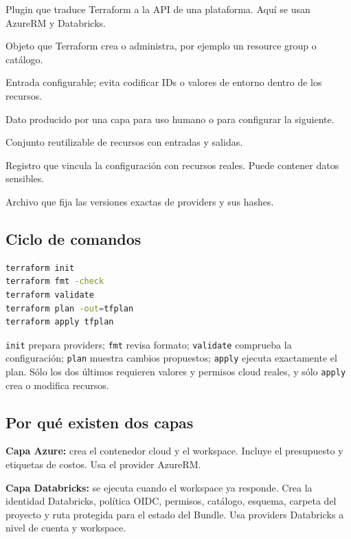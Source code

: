 \documentclass[11pt,a4paper]{article}
\begin{document}
\begin{description}[style=nextline,leftmargin=2em]
  \item[Provider] Plugin que traduce Terraform a la API de una plataforma. Aquí se usan AzureRM y Databricks.
  \item[Resource] Objeto que Terraform crea o administra, por ejemplo un resource group o catálogo.
  \item[Variable] Entrada configurable; evita codificar IDs o valores de entorno dentro de los recursos.
  \item[Output] Dato producido por una capa para uso humano o para configurar la siguiente.
  \item[Module] Conjunto reutilizable de recursos con entradas y salidas.
  \item[State] Registro que vincula la configuración con recursos reales. Puede contener datos sensibles.
  \item[Lockfile] Archivo que fija las versiones exactas de providers y sus hashes.
\end{description}

\subsection{Ciclo de comandos}

\begin{lstlisting}[language=bash]
terraform init
terraform fmt -check
terraform validate
terraform plan -out=tfplan
terraform apply tfplan
\end{lstlisting}

\texttt{init} prepara providers; \texttt{fmt} revisa formato; \texttt{validate} comprueba la
configuración; \texttt{plan} muestra cambios propuestos; \texttt{apply} ejecuta exactamente el plan.
Sólo los dos últimos requieren valores y permisos cloud reales, y sólo \texttt{apply} crea o modifica
recursos.

\subsection{Por qué existen dos capas}

\textbf{Capa Azure:} crea el contenedor cloud y el workspace. Incluye el presupuesto y etiquetas de
costos. Usa el provider AzureRM.

\textbf{Capa Databricks:} se ejecuta cuando el workspace ya responde. Crea la identidad Databricks,
política OIDC, permisos, catálogo, esquema, carpeta del proyecto y ruta protegida para el estado del
Bundle. Usa providers Databricks a nivel de cuenta y workspace.
\end{document}
